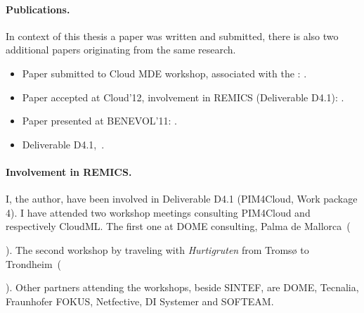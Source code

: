 \paragraph{Publications.}

In context of this thesis a paper was written and submitted,
there is also two additional papers originating from the same research.

\begin{itemize}
  \item
    Paper submitted to Cloud MDE workshop, associated with the :
    .
  \item
    Paper accepted at Cloud'12, involvement in REMICS (Deliverable D4.1):
    .
  \item
    Paper presented at BENEVOL'11:
    .
  \item 
    Deliverable D4.1,~.
\end{itemize}

\paragraph{Involvement in REMICS.}

I, the author, have been involved in  Deliverable D4.1 (PIM4Cloud, Work package 4).
I have attended two workshop meetings consulting PIM4Cloud and respectively CloudML.
The first one at DOME consulting, Palma de Mallorca~(\date{June 2011}).
The second workshop by traveling with \emph{Hurtigruten} from Troms{\o} to Trondheim~(\date{September 2011}).
Other partners attending the workshops, beside SINTEF, are DOME, Tecnalia, Fraunhofer FOKUS, Netfective, DI Systemer and SOFTEAM.
